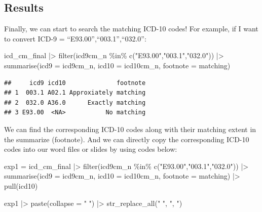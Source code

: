 \documentclass[
]{article}
\newenvironment{Shaded}{\begin{snugshade}}{\end{snugshade}}
\newcommand{\AttributeTok}[1]{\textcolor[rgb]{0.77,0.63,0.00}{#1}}
\newcommand{\FunctionTok}[1]{\textcolor[rgb]{0.00,0.00,0.00}{#1}}
\newcommand{\NormalTok}[1]{#1}
\newcommand{\OtherTok}[1]{\textcolor[rgb]{0.56,0.35,0.01}{#1}}
\newcommand{\SpecialCharTok}[1]{\textcolor[rgb]{0.00,0.00,0.00}{#1}}
\newcommand{\StringTok}[1]{\textcolor[rgb]{0.31,0.60,0.02}{#1}}
\begin{document}
\hypertarget{results}{%
\subsection{Results}\label{results}}

Finally, we can start to search the matching ICD-10 codes! For example,
if I want to convert ICD-9 = ``E93.00'',``003.1'',``032.0'':

\begin{Shaded}
\begin{Highlighting}[]
\NormalTok{icd\_cm\_final }\SpecialCharTok{|\textgreater{}}
  \FunctionTok{filter}\NormalTok{(icd9cm\_n }\SpecialCharTok{\%in\%} \FunctionTok{c}\NormalTok{(}\StringTok{"E93.00"}\NormalTok{,}\StringTok{"003.1"}\NormalTok{,}\StringTok{"032.0"}\NormalTok{)) }\SpecialCharTok{|\textgreater{}} 
  \FunctionTok{summarise}\NormalTok{(}\AttributeTok{icd9 =}\NormalTok{ icd9cm\_n, }\AttributeTok{icd10 =}\NormalTok{ icd10cm\_n, }\AttributeTok{footnote =}\NormalTok{ matching)}
\end{Highlighting}
\end{Shaded}

\begin{verbatim}
##     icd9 icd10              footnote
## 1  003.1 A02.1 Approxiately matching
## 2  032.0 A36.0      Exactly matching
## 3 E93.00  <NA>           No matching
\end{verbatim}

We can find the corresponding ICD-10 codes along with their matching
extent in the summarize (footnote). And we can directly copy the
corresponding ICD-10 codes into our word files or slides by using codes
below:

\begin{Shaded}
\begin{Highlighting}[]
\NormalTok{exp1 }\OtherTok{=}\NormalTok{ icd\_cm\_final }\SpecialCharTok{|\textgreater{}}
  \FunctionTok{filter}\NormalTok{(icd9cm\_n }\SpecialCharTok{\%in\%} \FunctionTok{c}\NormalTok{(}\StringTok{"E93.00"}\NormalTok{,}\StringTok{"003.1"}\NormalTok{,}\StringTok{"032.0"}\NormalTok{)) }\SpecialCharTok{|\textgreater{}} 
  \FunctionTok{summarise}\NormalTok{(}\AttributeTok{icd9 =}\NormalTok{ icd9cm\_n, }\AttributeTok{icd10 =}\NormalTok{ icd10cm\_n, }\AttributeTok{footnote =}\NormalTok{ matching) }\SpecialCharTok{|\textgreater{}}
  \FunctionTok{pull}\NormalTok{(icd10)}

\NormalTok{exp1 }\SpecialCharTok{|\textgreater{}} 
  \FunctionTok{paste}\NormalTok{(}\AttributeTok{collapse =} \StringTok{" "}\NormalTok{) }\SpecialCharTok{|\textgreater{}}
  \FunctionTok{str\_replace\_all}\NormalTok{(}\StringTok{" "}\NormalTok{, }\StringTok{", "}\NormalTok{)    }
\end{Highlighting}
\end{Shaded}
\end{document}
